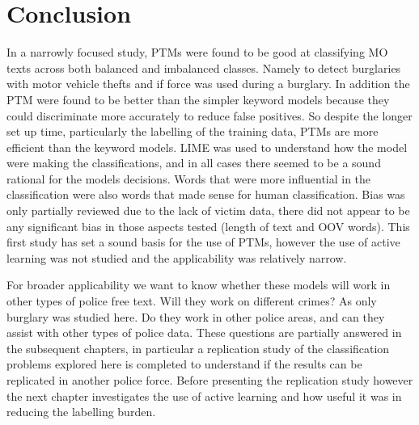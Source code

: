 \section{Conclusion} In a narrowly focused study, PTMs were found to be good at classifying MO texts across both balanced and imbalanced classes. Namely to detect burglaries with motor vehicle thefts and if force was used during a burglary. In addition the PTM were found to be better than the simpler keyword models because they could discriminate more accurately to reduce false positives. So despite the longer set up time, particularly the labelling of the training data, PTMs are more efficient than the keyword models. LIME was used to understand how the model were making the classifications, and in all cases there seemed to be a sound rational for the models decisions. Words that were more influential in the classification were also words that made sense for human classification. Bias was only partially reviewed due to the lack of victim data, there did not appear to be any significant bias in those aspects tested (length of text and OOV words). This first study has set a sound basis for the use of PTMs, however the use of active learning was not studied and the applicability was relatively narrow.

For broader applicability we want to know whether these models will work in other types of police free text. Will they work on different crimes? As only burglary was studied here. Do they work in other police areas, and can they assist with other types of police data. These questions are partially answered in the subsequent chapters, in particular a replication study of the classification problems explored here is completed to understand if the results can be replicated in another police force. Before presenting the replication study however the next chapter investigates the use of active learning and how useful it was in reducing the labelling burden.


